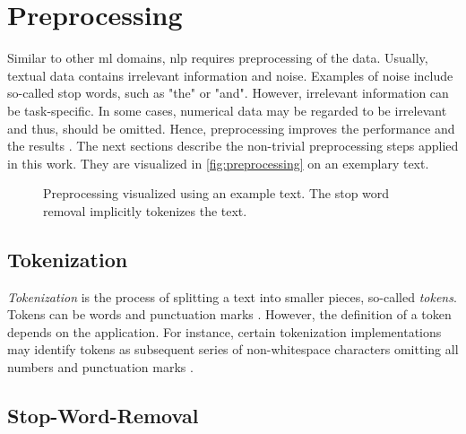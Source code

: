 \section{Preprocessing}\label{sec:preprocessing}

Similar to other \ac{ml} domains, \ac{nlp} requires preprocessing of the data.
Usually, textual data contains irrelevant information and noise.
Examples of noise include so-called stop words, such as "the" or "and".
However, irrelevant information can be task-specific. 
In some cases, numerical data may be regarded to be irrelevant and thus, should be omitted.
Hence, preprocessing improves the performance and the results \cite{clusteringDocs2020}.
The next sections describe the non-trivial preprocessing steps applied in this work.
They are visualized in \autoref{fig:preprocessing} on an exemplary text.

\begin{figure}[!htb] %
    \centering
    
    \caption[Preprocessing]{Preprocessing visualized using an example text.
    The stop word removal implicitly tokenizes the text.}
    \label{fig:preprocessing}
\end{figure}


\subsection{Tokenization}\label{subsec:tokenization}

\textit{Tokenization} is the process of splitting a text into smaller pieces, so-called \textit{tokens}.
Tokens can be words and punctuation marks \cite{nlp-book2009}.
However, the definition of a token depends on the application.
For instance, certain tokenization implementations may identify tokens as subsequent series of non-whitespace characters omitting all numbers and punctuation marks \cite{IR2011}.



\subsection{Stop-Word-Removal}\label{subsec:stop-word-removal}

